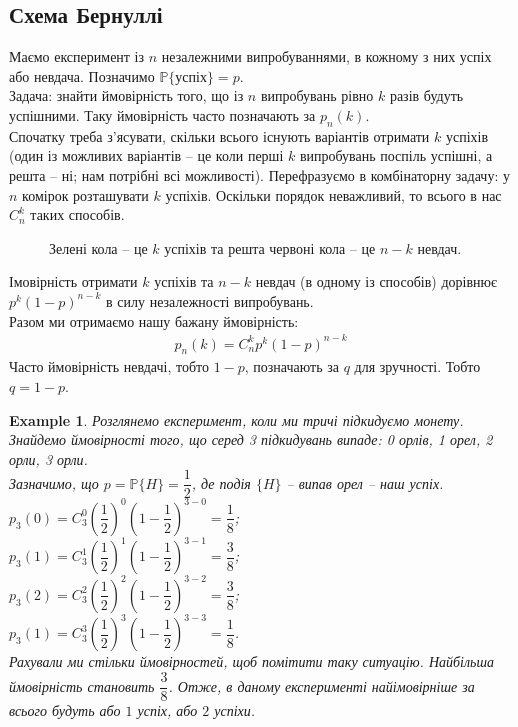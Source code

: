 \documentclass[a4paper, 10pt]{article}
\theoremstyle{theoremdd}
\newtheorem{example}[theorem]{Example}
\begin{document}
\subsection{Схема Бернуллі}
Маємо експеримент із $n$ незалежними випробуваннями, в кожному з них успіх або невдача. Позначимо $\mathbb{P}\{\text{успіх}\} = p$.\\
Задача: знайти ймовірність того, що із $n$ випробувань рівно $k$ разів будуть успішними. Таку ймовірність часто позначають за $p_n(k)$.
\bigskip \\
Спочатку треба з'ясувати, скільки всього існують варіантів отримати $k$ успіхів (один із можливих варіантів -- це коли перші $k$ випробувань поспіль успішні, а решта -- ні; нам потрібні всі можливості). Перефразуємо в комбінаторну задачу: у $n$ комірок розташувати $k$ успіхів. Оскільки порядок неважливий, то всього в нас $C_n^k$ таких способів.
\begin{figure}[H]
\centering
{}
\caption*{Зелені кола -- це $k$ успіхів та решта червоні кола -- це $n-k$ невдач.}
\end{figure}
\noindent
Імовірність отримати $k$ успіхів та $n-k$ невдач (в одному із способів) дорівнює $p^k (1-p)^{n-k}$ в силу незалежності випробувань.\\
Разом ми отримаємо нашу бажану ймовірність:
\begin{align*}
p_n(k) = C_n^k p^k (1-p)^{n-k}
\end{align*}
\noindent
Часто ймовірність невдачі, тобто $1-p$, позначають за $q$ для зручності. Тобто $q = 1-p$.

\begin{example}
Розглянемо експеримент, коли ми тричі підкидуємо монету. Знайдемо ймовірності того, що серед 3 підкидувань випаде: 0 орлів, 1 орел, 2 орли, 3 орли.\\
Зазначимо, що $p = \mathbb{P}\{H\} = \dfrac{1}{2}$, де подія $\{H\}$ -- випав орел -- наш успіх.\\
$p_3(0) = C_3^0 \left(\dfrac{1}{2}\right)^0 \left(1 - \dfrac{1}{2}\right)^{3-0} = \dfrac{1}{8}$;\\
$p_3(1) = C_3^1 \left(\dfrac{1}{2}\right)^1 \left(1 - \dfrac{1}{2}\right)^{3-1} = \dfrac{3}{8}$;\\
$p_3(2) = C_3^2 \left(\dfrac{1}{2}\right)^2 \left(1 - \dfrac{1}{2}\right)^{3-2} = \dfrac{3}{8}$;\\
$p_3(1) = C_3^3 \left(\dfrac{1}{2}\right)^3 \left(1 - \dfrac{1}{2}\right)^{3-3} = \dfrac{1}{8}$.\\
Рахували ми стільки ймовірностей, щоб помітити таку ситуацію. Найбільша ймовірність становить $\dfrac{3}{8}$. Отже, в даному експерименті найімовірніше за всього будуть або $1$ успіх, або $2$ успіхи. 
\end{example}
\end{document}
